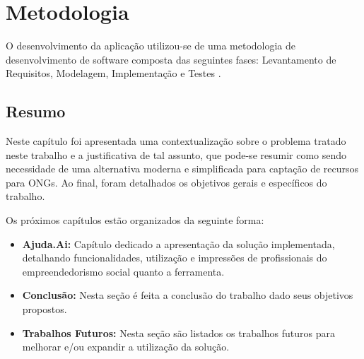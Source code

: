 \chapter{Metodologia}

O desenvolvimento da aplicação utilizou-se de uma metodologia de desenvolvimento de software composta das seguintes fases: Levantamento de Requisitos, Modelagem, Implementação e Testes \cite{sommerville2003engenharia}.



\section*{Resumo}
Neste capítulo foi apresentada uma contextualização sobre o problema tratado neste trabalho e a justificativa de tal assunto, que pode-se resumir como sendo necessidade de uma alternativa moderna e simplificada para captação de recursos para ONGs. Ao final, foram detalhados os objetivos gerais e específicos do trabalho.

Os próximos capítulos estão organizados da seguinte forma:

\begin{itemize}
  \item \textbf{Ajuda.Ai:} Capítulo dedicado a apresentação da solução implementada, detalhando funcionalidades, utilização e impressões de profissionais do empreendedorismo social quanto a ferramenta.
  \item \textbf{Conclusão:} Nesta seção é feita a conclusão do trabalho dado seus objetivos propostos.
  \item \textbf{Trabalhos Futuros:} Nesta seção são listados os trabalhos futuros para melhorar e/ou expandir a utilização da solução.
\end{itemize}